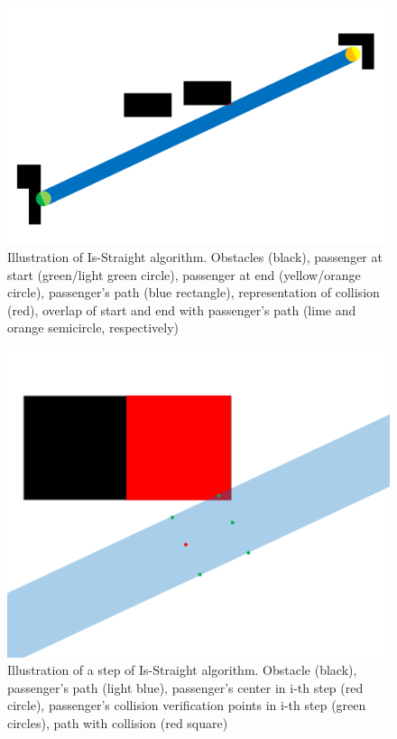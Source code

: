 \begin{figure}[H]
    \centering
    \includegraphics[width=\columnwidth]{assets/is-straight.png}
    \caption{Illustration of Is-Straight algorithm. Obstacles (black), passenger at start (green/light green circle), passenger at end (yellow/orange circle), passenger's path (blue rectangle), representation of collision (red), overlap of start and end with passenger's path (lime and orange semicircle, respectively)}
    \label{fig:is_straight}
\end{figure}

\begin{figure}[H]
    \centering
    \includegraphics[width=\columnwidth]{assets/is-straight-step.png}
    \caption{Illustration of a step of Is-Straight algorithm. Obstacle (black), passenger's path (light blue), passenger's center in i-th step (red circle), passenger's collision verification points in i-th step (green circles), path with collision (red square)}
    \label{fig:is_straight_step}
\end{figure}

